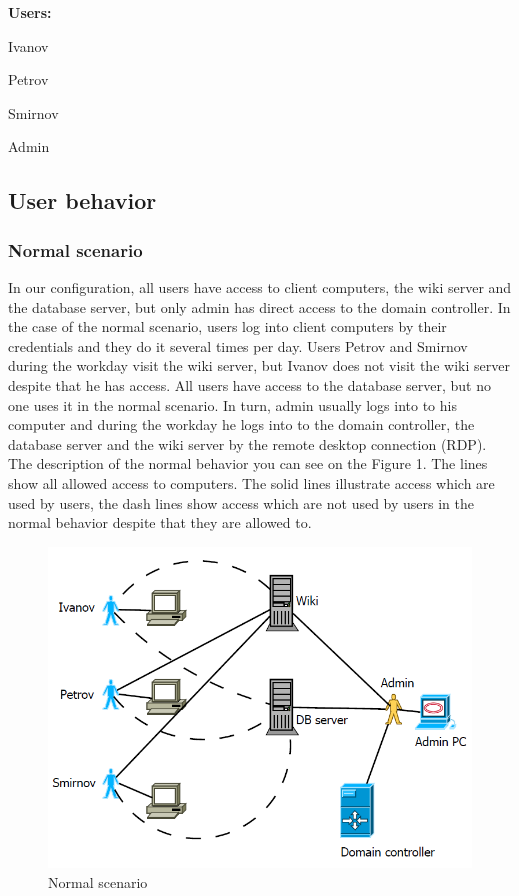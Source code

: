 \begin{compactitem}
\item [\textbf{Users:}]
\item Ivanov
\item Petrov
\item Smirnov
\item Admin
\end{compactitem}
     
     
\subsection{User behavior}
\subsubsection{Normal scenario}
In our configuration, all users have access to client computers, the wiki server and the database server, but only admin has direct access to the domain controller. In the case of the normal scenario, users log into client computers by their credentials and they do it several times per day. Users Petrov and Smirnov during the workday visit the wiki server, but Ivanov does not visit the wiki server despite that he has access. All users have access to the database server, but no one uses it in the normal scenario. In turn, admin usually logs into to his computer and during the workday he logs into to the domain controller, the database server and the wiki server by the remote desktop connection (RDP). The description of the normal behavior you can see on the Figure 1. The lines show all allowed access to computers. The solid lines illustrate access which are used by users, the dash lines show access which are not used by users in the normal behavior despite that they are allowed to. 

\begin{figure}[ht!]
\centering
\includegraphics[width=\textwidth]{scenario_normal.png}
\caption{Normal scenario}
\label{overflow}
\end{figure}

